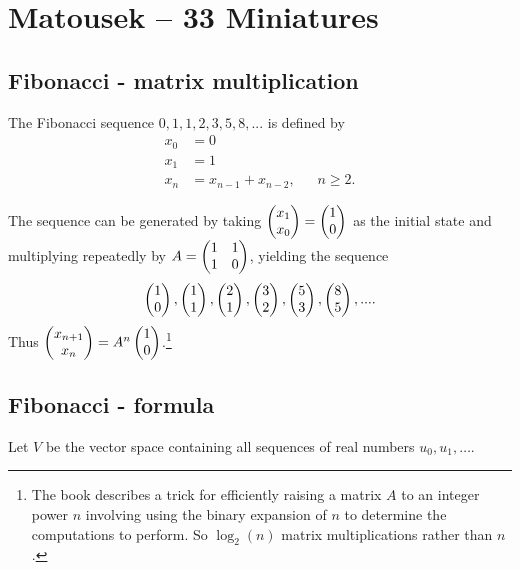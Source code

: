 \section{Matousek -- 33 Miniatures}

\subsection{Fibonacci - matrix multiplication}\label{fibonacci-matrix-multiplication}

\begin{definition*}
  The Fibonacci sequence $0, 1, 1, 2, 3, 5, 8, ...$ is defined by
  \begin{align*}
    x_0 &= 0\\
    x_1 &= 1\\
    x_{n} &= x_{n-1} + x_{n-2}, ~~~~~~~ n \geq 2.
  \end{align*}
\end{definition*}

\begin{remark*}
  The sequence can be generated by taking $\begin{pmatrix}x_1\\x_0\end{pmatrix} = \begin{pmatrix}1\\0\end{pmatrix}$ as the initial state and multiplying
  repeatedly by $A = \begin{pmatrix}1 & 1\\1 & 0\\ \end{pmatrix}$, yielding the sequence
  \begin{align*}
    \begin{pmatrix}1\\0\end{pmatrix}, \begin{pmatrix}1\\1\end{pmatrix}, \begin{pmatrix}2\\1\end{pmatrix}, \begin{pmatrix}3\\2\end{pmatrix}, \begin{pmatrix}5\\3\end{pmatrix}, \begin{pmatrix}8\\5\end{pmatrix}, ....
  \end{align*}
  Thus $\begin{pmatrix}x_{n+1}\\x_n\end{pmatrix} = A^n\begin{pmatrix}1\\0\end{pmatrix}$.\footnote{The book describes a trick for
    efficiently raising a matrix $A$ to an integer power $n$ involving using the binary expansion
    of $n$ to determine the computations to perform. So $\log_2(n)$ matrix multiplications rather
    than $n$.}
\end{remark*}

\newpage
\subsection{Fibonacci - formula}

Let $V$ be the vector space containing all sequences of real numbers
$u_0, u_1, \ldots$.

\begin{comment}
  \begin{proof}
    This is a vector space since:
    \begin{enumerate}
    \item It's an Abelian group under addition (the zero sequence is the additive identity, inverse
      is obtained by negating each element, addition is associative and commutative)
    \item Closed under scalar multiplication since $\lambda u_0, \lambda u_1, ... \in V$.
    \end{enumerate}
  \end{proof}
\end{comment}

